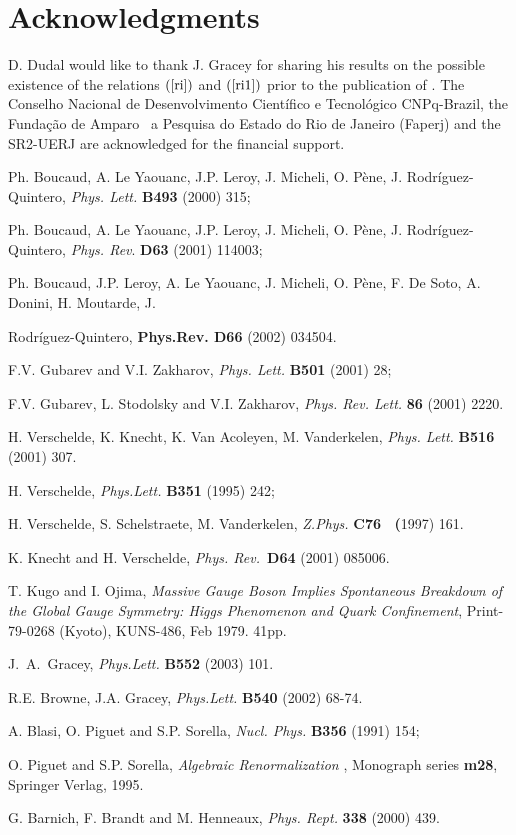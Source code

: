 \documentclass[a4paper,12pt]{article}
\begin{document}
\section{Acknowledgments}

D. Dudal would like to thank J. Gracey for sharing his results on the
possible existence of the relations $\left( \ref{ri}\right) $ and $\left( 
\ref{ri1}\right) $ prior to the publication of \cite{gr}. The Conselho
Nacional de Desenvolvimento Cient\'{i}fico e Tecnol\'{o}gico CNPq-Brazil,
the Funda{\c{c}}{\~{a}}o de Amparo {\ a Pesquisa do Estado do Rio de Janeiro
(Faperj) and the SR2-UERJ are acknowledged for the financial support. }

\begin{thebibliography}{99}
  Ph. Boucaud, A. Le Yaouanc, J.P. Leroy, J. Micheli, O.
P\`{e}ne, J. Rodr\'{i}guez-Quintero, \emph{Phys. Lett.} \textbf{B493} (2000)
315;

Ph. Boucaud, A. Le Yaouanc, J.P. Leroy, J. Micheli, O. P\`{e}ne, J.
Rodr\'{i}guez-Quintero, \emph{Phys. Rev}. \textbf{D63} (2001) 114003;

Ph. Boucaud, J.P. Leroy, A. Le Yaouanc, J. Micheli, O. P\`{e}ne, F. De Soto,
A. Donini, H. Moutarde, J.

Rodr\'{i}guez-Quintero, \textbf{Phys.Rev. D66} (2002) 034504.

  F.V. Gubarev and V.I. Zakharov, \emph{Phys. Lett.} \textbf{B501 
}(2001) 28;

F.V. Gubarev, L. Stodolsky and V.I. Zakharov, \emph{Phys. Rev. Lett.} 
\textbf{86} (2001) 2220.

  H. Verschelde, K. Knecht, K. Van Acoleyen, M. Vanderkelen, 
\emph{Phys. Lett.} \textbf{B516} (2001) 307.

  H. Verschelde, \emph{Phys.Lett. }\textbf{B351} (1995) 242;

H. Verschelde, S. Schelstraete, M. Vanderkelen, \emph{Z.Phys. }\textbf{C76 \
(}1997) 161.

K. Knecht and H. Verschelde, \emph{Phys. Rev.\ }\textbf{D64} (2001) 085006.

  T. Kugo and I. Ojima, \emph{Massive Gauge Boson Implies
Spontaneous Breakdown of the Global Gauge Symmetry: Higgs Phenomenon and
Quark Confinement}, Print-79-0268 (Kyoto), KUNS-486, Feb 1979. 41pp.

  J.~A.~Gracey, \emph{Phys.Lett.} \textbf{B552} (2003) 101.

R.E. Browne, J.A. Gracey, \emph{Phys.Lett.} \textbf{B540} (2002) 68-74.

  A. Blasi, O. Piguet and S.P. Sorella, \emph{Nucl. Phys. }%
\textbf{B356 }(1991) 154;

  O. Piguet and S.P. Sorella, \emph{Algebraic Renormalization}%
, Monograph series \textbf{m28}, Springer Verlag, 1995.\emph{\ }

  G. Barnich, F. Brandt and M. Henneaux, \emph{Phys. Rept.} 
\textbf{338 }(2000) 439.
\end{thebibliography}
\end{document}
